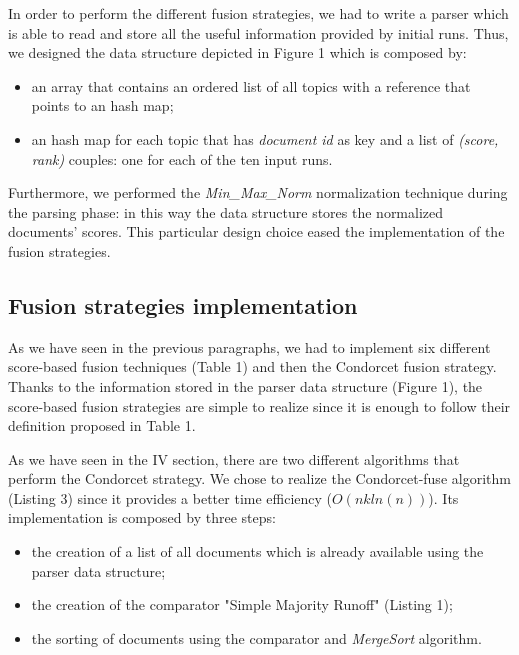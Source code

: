 \documentclass[letterpaper, 10 pt, conference]{ieeeconf}  %
\begin{document}
In order to perform the different fusion strategies, we had to write a parser which is able to read and store all the useful information provided by initial runs. Thus, we designed the data structure depicted in Figure 1 which is composed by:
\begin{itemize}
\item an array that contains an ordered list of all topics with a reference that points to an hash map; 
\item an hash map for each topic that has \textit{document id} as key and a list of \textit{(score, rank)} couples: one for each of the ten input runs.
\end{itemize}


Furthermore, we performed the \textit{Min\_Max\_Norm} normalization technique during the parsing phase: in this way the data structure stores the normalized documents' scores. This particular design choice eased the implementation of the fusion strategies. 

\subsection{Fusion strategies implementation}
As we have seen in the previous paragraphs, we had to implement six different score-based fusion techniques (Table 1) and then the  Condorcet fusion strategy. Thanks to the information stored in the parser data structure (Figure 1), the score-based fusion strategies are simple to realize since it is enough to follow their definition proposed in Table 1.

As we have seen in the IV section, there are two different algorithms that perform the Condorcet strategy. We chose to realize the Condorcet-fuse algorithm (Listing 3) since it provides a better time efficiency ($O(nkln(n))$). Its implementation is composed by three steps:
\begin{itemize}
\item the creation of a list of all documents which is already available using the parser data structure;
\item the creation of the comparator "Simple Majority Runoff" (Listing 1);
\item the sorting of documents using the comparator and \textit{MergeSort} algorithm.
\end{itemize}
\end{document}
